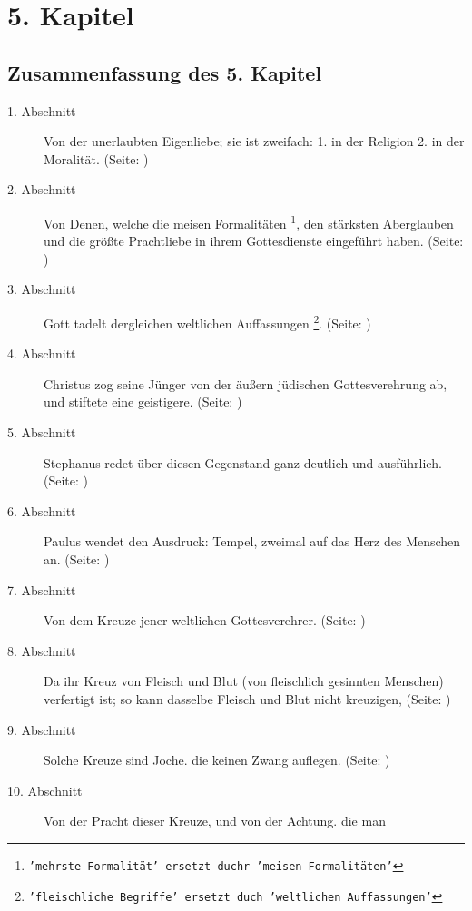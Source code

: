 


\chapter{5. Kapitel} \label{kap5}

\section{Zusammenfassung des 5. Kapitel}
\footnotesize
\begin{description}
\item[1. Abschnitt] Von der unerlaubten Eigenliebe; sie ist zweifach: 1. in der
Religion  2. in der Moralität. (Seite: \pageref{kap5_ab1})
\item[2. Abschnitt] Von Denen, welche die meisen Formalitäten
\footnote{\texttt{'mehrste Formalität' ersetzt duchr 'meisen Formalitäten'}}, den
stärksten
Aberglauben und die größte Prachtliebe in ihrem Gottesdienste eingeführt haben.
(Seite: \pageref{kap5_ab2})
\item[3. Abschnitt] Gott tadelt dergleichen weltlichen Auffassungen
\footnote{\texttt{'fleischliche Begriffe' ersetzt duch 'weltlichen Auffassungen'}}.
(Seite:
\pageref{kap5_ab3})
\item[4. Abschnitt] Christus zog seine Jünger von der äußern jüdischen
Gottesverehrung ab, und stiftete eine geistigere. (Seite: \pageref{kap5_ab4})
\item[5. Abschnitt] Stephanus redet über diesen Gegenstand ganz deutlich und
ausführlich. (Seite: \pageref{kap5_ab5})
\item[6. Abschnitt] Paulus wendet den Ausdruck: Tempel, zweimal auf das Herz des
Menschen an. (Seite: \pageref{kap5_ab6})
\item[7. Abschnitt] Von dem Kreuze jener weltlichen Gottesverehrer. (Seite:
\pageref{kap5_ab7})
\item[8. Abschnitt] Da ihr Kreuz von Fleisch und Blut (von fleischlich gesinnten
Menschen) verfertigt ist; so kann dasselbe Fleisch und Blut nicht kreuzigen,
(Seite: \pageref{kap5_ab8})
\item[9. Abschnitt] Solche Kreuze sind Joche. die keinen Zwang auflegen. (Seite:
\pageref{kap5_ab9})
\item[10. Abschnitt] Von der Pracht dieser Kreuze, und von der Achtung. die man

\end{description}
